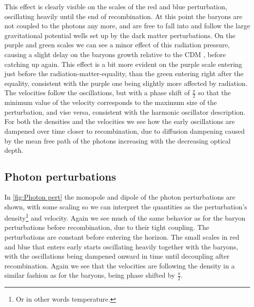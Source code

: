 \documentclass[10pt,a4paper]{article}
\providecommand{\rCDM}
{\ensuremath{
\textrm{CDM}
}
}
\begin{document}
This effect is clearly visible on the scales of the red and blue perturbation, oscillating heavily until the end of recombination. At this point the baryons are not coupled to the photons any more, and are free to fall into and follow the large gravitational potential wells set up by the dark matter perturbations. On the purple and green scales we can see a minor effect of this radiation pressure, causing a slight delay on the baryons growth relative to the \rCDM, before catching up again. This effect is a bit more evident on the purple scale entering just before the radiation-matter-equality, than the green entering right after the equality, consistent with the purple one being slightly more affected by radiation. The velocities follow the oscillations, but with a phase shift of $\frac{\pi}{2}$ so that the minimum value of the velocity corresponds to the maximum size of the perturbation, and vise versa, consistent with the harmonic oscillator description. For both the densities and the velocities we see how the early oscillations are dampened over time closer to recombination, due to diffusion dampening caused by the mean free path of the photons increasing with the decreasing optical depth.

\subsection{Photon perturbations}
\label{subsec:Results/Photon pert}
In \cref{fig:Photon pert} the monopole and dipole of the photon perturbations are shown, with some scaling so we can interpret the quantities as the perturbation's density\footnote{Or in other words temperature.} and velocity. Again we see much of the same behavior as for the baryon perturbations before recombination, due to their tight coupling. The perturbations are constant before entering the horizon. The small scales in red and blue that enters early starts oscillating heavily together with the baryons, with the oscillations being dampened onward in time until decoupling after recombination. Again we see that the velocities are following the density in a similar fashion as for the baryons, being phase shifted by $\frac{\pi}{2}$.
\end{document}
